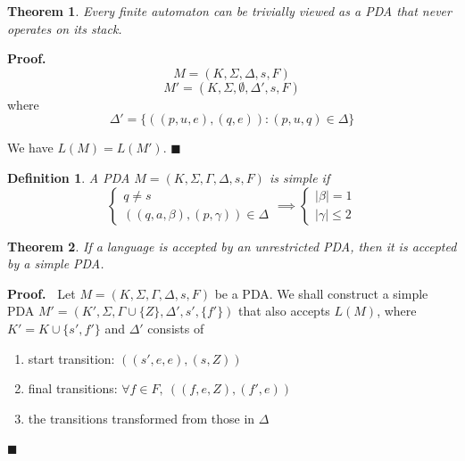 \documentclass[aps,pra,onecolumn,notitlepage,superscriptaddress]{revtex4-1}
\newtheorem{theo}{Theorem}
\newtheorem{defi}{Definition}
\def\Proof{{\bf Proof.~}}
\def\qed{$\blacksquare$ \newline}
\begin{document}
    \begin{theo}
        Every finite automaton can be trivially viewed as a PDA that never operates on its stack.
    \end{theo}
    \Proof
    \begin{equation}
        M = (K, \Sigma, \Delta, s, F)
    \end{equation}
    \begin{equation}
        M' = (K, \Sigma, \emptyset, \Delta', s, F)
    \end{equation}
    where
    \begin{equation}
        \Delta' = \{ ((p,u,e),(q,e)) : (p,u,q) \in \Delta \}
    \end{equation}

    We have $L(M) = L(M')$. \qed

    \begin{defi}
        A PDA $M = (K, \Sigma, \Gamma, \Delta, s, F)$ is simple if
        \begin{equation}
            \begin{cases}
                q \neq s \\
                ((q, a, \beta), (p, \gamma)) \in \Delta
            \end{cases}
            \implies \begin{cases}
                |\beta| = 1 \\
                |\gamma| \leq 2
            \end{cases}
        \end{equation}
    \end{defi}
    \begin{theo}
        If a language is accepted by an unrestricted PDA, then it is accepted by a simple PDA.
    \end{theo}
    \Proof
        Let $M = (K,\Sigma,\Gamma,\Delta,s,F)$ be a PDA. 
        We shall construct a simple PDA $M' = (K', \Sigma, \Gamma \cup \{Z\}, \Delta', s', \{f'\})$ that also accepts $L(M)$, where $K' = K \cup \{ s', f' \}$ and $\Delta'$ consists of
        \begin{enumerate}
            \item start transition: $((s',e,e),(s,Z))$
            \item final transitions: $\forall f \in F, \ ((f,e,Z),(f',e))$
            \item the transitions transformed from those in $\Delta$
        \end{enumerate}
    \qed
\end{document}

